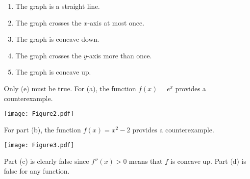 \documentclass[handout, nooutcomes]{ximera}
\renewenvironment{freeResponse}{
\ifhandout\setbox0\vbox\bgroup\else
\begin{trivlist}\item[\hskip \labelsep\bfseries Solution:\hspace{2ex}]
\fi}
{\ifhandout\egroup\else
\end{trivlist}
\fi}
\begin{document}
\begin{problem}
\begin{enumerate}
\begin{enumerate}
                        \item The graph is a straight line.
                        \item The graph crosses the $x$-axis at most
                          once.
                        \item The graph is concave down.
                        \item The graph crosses the $y$-axis more than
                          once.
                        \item The graph is concave up.
		
                        \end{enumerate}

			\begin{freeResponse}
                          Only (e) must be true.  For (a), the
                          function $f(x) = e^x$ provides a
                          counterexample.
			
                          \begin{image}
                            \texttt{[image: Figure2.pdf]}
                          \end{image}
			
                          For part (b), the function $f(x) = x^2 -2$
                          provides a counterexample.
			
                          \begin{image}
                            \texttt{[image: Figure3.pdf]}
                          \end{image}
			
                          Part (c) is clearly false since $f''(x) > 0$
                          means that $f$ is concave up.  Part (d) is
                          false for any function.
			
			\end{freeResponse}
		
		
		
                      \end{enumerate}
                    \end{problem}
		
		

	
\newpage
\end{document}
